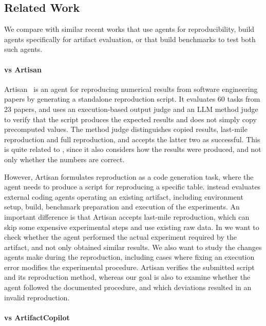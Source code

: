 \subsection{Related Work}

We compare \aebench with similar recent works that use agents 
  for reproducibility, build agents specifically for artifact evaluation,
  or that build benchmarks to test both such agents.

\paragraph{\aebench vs Artisan}

Artisan~\cite{baek-ase26} is an agent for reproducing numerical results from
  software engineering papers by generating a standalone reproduction script.
It evaluates 60 tasks from 23 papers, and uses an execution-based output judge
  and an LLM method judge to verify that the script produces the expected
  results and does not simply copy precomputed values.
The method judge distinguishes copied results, last-mile reproduction and
  full reproduction, and accepts the latter two as successful.
This is quite related to \aebench, since it also considers how the results
  were produced, and not only whether the numbers are correct.

However, Artisan formulates reproduction as a code generation task, where
  the agent needs to produce a script for reproducing a specific table.
\aebench instead evaluates external coding agents operating an existing
  artifact, including environment setup, build, benchmark preparation and
  execution of the experiments.
An important difference is that Artisan accepts last-mile reproduction,
  which can skip some expensive experimental steps and use existing raw data.
In \aebench we want to check whether the agent performed the actual
  experiment required by the artifact, and not only obtained similar results.
We also want to study the changes agents make during the reproduction,
  including cases where fixing an execution error modifies the experimental
  procedure.
Artisan verifies the submitted script and its reproduction method, whereas
  our goal is also to examine whether the agent followed the documented
  procedure, and which deviations resulted in an invalid reproduction.

\paragraph{\aebench vs ArtifactCopilot}

